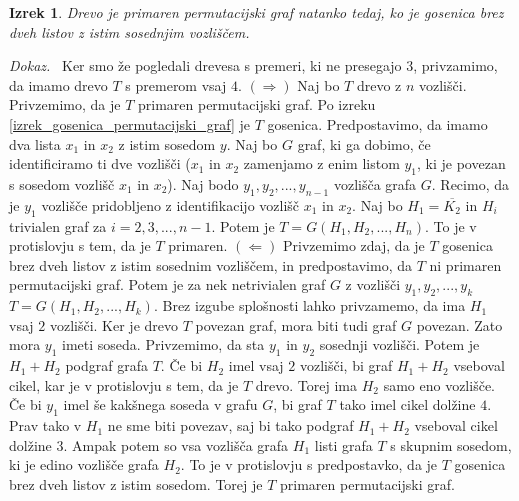 \documentclass[a4paper, 12pt]{book}
\newtheorem{izrek}{Izrek}[chapter]
\newenvironment{dokaz}{\emph{Dokaz.}\ }{\hspace{\fill}{$\Box$}}
\begin{document}
\begin{izrek}
    Drevo je primaren permutacijski graf natanko tedaj, ko je gosenica brez dveh listov z istim sosednjim vozliščem.
\end{izrek}
\begin{dokaz}
    Ker smo že pogledali drevesa s premeri, ki ne presegajo $3$, privzamimo, da imamo drevo $T$ s premerom vsaj $4$. $(\Rightarrow)$ Naj bo $T$ drevo z $n$ vozlišči. Privzemimo, da je $T$ primaren permutacijski graf. Po izreku \ref{izrek_gosenica_permutacijski_graf} je $T$ gosenica. Predpostavimo, da imamo dva lista $x_1$ in $x_2$ z istim sosedom $y$. Naj bo $G$ graf, ki ga dobimo, če identificiramo ti dve vozlišči ($x_1$ in $x_2$ zamenjamo z enim listom $y_1$, ki je povezan s sosedom vozlišč $x_1$ in $x_2$). Naj bodo $y_1, y_2, ..., y_{n-1}$ vozlišča grafa $G$. Recimo, da je $y_1$ vozlišče pridobljeno z identifikacijo vozlišč $x_1$ in $x_2$. Naj bo $H_1 = \overline{K_2}$ in $H_i$ trivialen graf za $i = 2, 3, ..., n-1$. Potem je $T = G(H_1, H_2, ..., H_n)$. To je v protislovju s tem, da je $T$ primaren. $(\Leftarrow)$ Privzemimo zdaj, da je $T$ gosenica brez dveh listov z istim sosednim vozliščem, in predpostavimo, da $T$ ni primaren permutacijski graf. Potem je za nek netrivialen graf $G$ z vozlišči $y_1, y_2, ..., y_k$ $T = G(H_1, H_2, ..., H_k)$. Brez izgube splošnosti lahko privzamemo, da ima $H_1$ vsaj $2$ vozlišči. Ker je drevo $T$ povezan graf, mora biti tudi graf $G$ povezan. Zato mora $y_1$ imeti soseda. Privzemimo, da sta $y_1$ in $y_2$ sosednji vozlišči. Potem je $H_1 + H_2$ podgraf grafa $T$. Če bi $H_2$ imel vsaj $2$ vozlišči, bi graf $H_1 + H_2$ vseboval cikel, kar je v protislovju s tem, da je $T$ drevo. Torej ima $H_2$ samo eno vozlišče. Če bi $y_1$ imel še kakšnega soseda v grafu $G$, bi graf $T$ tako imel cikel dolžine $4$. Prav tako v $H_1$ ne sme biti povezav, saj bi tako podgraf $H_1 + H_2$ vseboval cikel dolžine $3$. Ampak potem so vsa vozlišča grafa $H_1$ listi grafa $T$ s skupnim sosedom, ki je edino vozlišče grafa $H_2$. To je v protislovju s predpostavko, da je $T$ gosenica brez dveh listov z istim sosedom. Torej je $T$ primaren permutacijski graf.
\end{dokaz}
\end{document}
